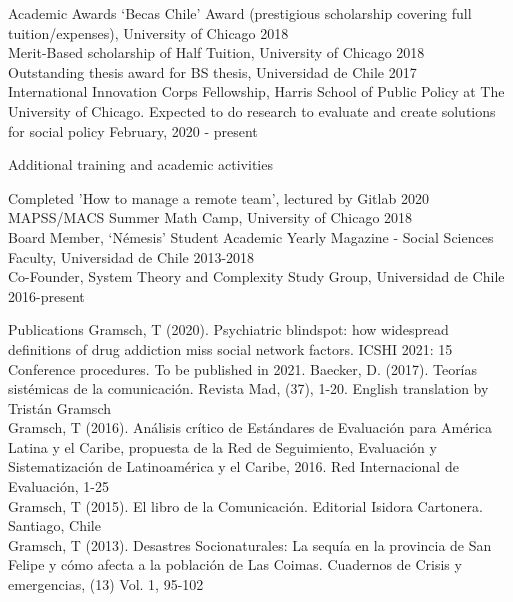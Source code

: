 \documentclass{resume} %
\begin{document}
\begin{rSection}{Academic Awards}
{‘Becas Chile’ Award (prestigious scholarship covering full tuition/expenses), University of Chicago} \hfill 2018\\
{Merit-Based scholarship of Half Tuition, University of Chicago} \hfill 2018\\
{Outstanding thesis award for BS thesis, Universidad de Chile} \hfill 2017\\
{International Innovation Corps Fellowship, Harris School of Public Policy at The University of Chicago. Expected to do research to evaluate and create solutions for social policy} \hfill {February, 2020 - present}

\end{rSection}

\begin{rSection}{Additional training and academic activities}

{{Completed 'How to manage a remote team', lectured by Gitlab}}  \hfill 2020\\
{{MAPSS/MACS Summer Math Camp, University of Chicago}}  \hfill 2018\\
{{Board Member, ‘Némesis’ Student Academic Yearly Magazine - Social Sciences Faculty, Universidad de Chile}}  \hfill 2013-2018\\
{{Co-Founder, System Theory and Complexity Study Group, Universidad de Chile}}  \hfill 2016-present

\end{rSection}

\begin{rSection}{Publications}
Gramsch, T (2020). Psychiatric blindspot: how widespread definitions of drug addiction miss social network factors. ICSHI 2021: 15 Conference procedures. To be published in 2021. 
Baecker, D. (2017). Teorías sistémicas de la comunicación. Revista Mad, (37), 1-20. English translation by Tristán Gramsch\\
Gramsch, T (2016). Análisis crítico de Estándares de Evaluación para América Latina y el Caribe, propuesta de la Red de Seguimiento, Evaluación y Sistematización de Latinoamérica y el Caribe, 2016. Red Internacional de Evaluación, 1-25\\
Gramsch, T (2015). El libro de la Comunicación. Editorial Isidora Cartonera. Santiago, Chile\\
Gramsch, T (2013). Desastres Socionaturales: La sequía en la provincia de San Felipe y cómo afecta a la población de Las Coimas. Cuadernos de Crisis y emergencias, (13) Vol. 1, 95-102

\end{rSection}
\end{document}

